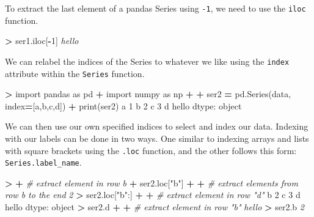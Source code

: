 \documentclass[
]{book}
\newenvironment{Shaded}{\begin{snugshade}}{\end{snugshade}}
\newcommand{\BuiltInTok}[1]{#1}
\newcommand{\CommentTok}[1]{\textcolor[rgb]{0.56,0.35,0.01}{\textit{#1}}}
\newcommand{\DecValTok}[1]{\textcolor[rgb]{0.00,0.00,0.81}{#1}}
\newcommand{\ImportTok}[1]{#1}
\newcommand{\NormalTok}[1]{#1}
\newcommand{\OperatorTok}[1]{\textcolor[rgb]{0.81,0.36,0.00}{\textbf{#1}}}
\newcommand{\StringTok}[1]{\textcolor[rgb]{0.31,0.60,0.02}{#1}}
\begin{document}
To extract the last element of a pandas Series using \texttt{-1}, we need to use the \texttt{iloc} function.

\begin{Shaded}
\begin{Highlighting}[]
\OperatorTok{\textgreater{}}\NormalTok{ ser1.iloc[}\OperatorTok{{-}}\DecValTok{1}\NormalTok{]}
\CommentTok{\textquotesingle{}hello\textquotesingle{}}
\end{Highlighting}
\end{Shaded}

We can relabel the indices of the Series to whatever we like using the \texttt{index} attribute within the \texttt{Series} function.

\begin{Shaded}
\begin{Highlighting}[]
\OperatorTok{\textgreater{}} \ImportTok{import}\NormalTok{ pandas }\ImportTok{as}\NormalTok{ pd }
\OperatorTok{+} \ImportTok{import}\NormalTok{ numpy }\ImportTok{as}\NormalTok{ np}
\OperatorTok{+} 
\OperatorTok{+}\NormalTok{ ser2 }\OperatorTok{=}\NormalTok{ pd.Series(data, index}\OperatorTok{=}\NormalTok{[}\StringTok{\textquotesingle{}a\textquotesingle{}}\NormalTok{,}\StringTok{\textquotesingle{}b\textquotesingle{}}\NormalTok{,}\StringTok{\textquotesingle{}c\textquotesingle{}}\NormalTok{,}\StringTok{\textquotesingle{}d\textquotesingle{}}\NormalTok{])}
\OperatorTok{+} \BuiltInTok{print}\NormalTok{(ser2)}
\NormalTok{a        }\DecValTok{1}
\NormalTok{b        }\DecValTok{2}
\NormalTok{c        }\DecValTok{3}
\NormalTok{d    hello}
\NormalTok{dtype: }\BuiltInTok{object}
\end{Highlighting}
\end{Shaded}

We can then use our own specified indices to select and index our data. Indexing with our labels can be done in two ways. One similar to indexing arrays and lists with square brackets using the \texttt{.loc} function, and the other follows this form: \texttt{Series.label\_name}.

\begin{Shaded}
\begin{Highlighting}[]
\OperatorTok{\textgreater{}} 
\OperatorTok{+} \CommentTok{\# extract element in row b}
\OperatorTok{+}\NormalTok{ ser2.loc[}\StringTok{"b"}\NormalTok{]}
\OperatorTok{+} 
\OperatorTok{+} \CommentTok{\# extract elements from row b to the end}
\CommentTok{\textquotesingle{}2\textquotesingle{}}
\OperatorTok{\textgreater{}}\NormalTok{ ser2.loc[}\StringTok{"b"}\NormalTok{:]}
\OperatorTok{+} 
\OperatorTok{+} \CommentTok{\# extract element in row "d"}
\NormalTok{b        }\DecValTok{2}
\NormalTok{c        }\DecValTok{3}
\NormalTok{d    hello}
\NormalTok{dtype: }\BuiltInTok{object}
\OperatorTok{\textgreater{}}\NormalTok{ ser2.d}
\OperatorTok{+} 
\OperatorTok{+} \CommentTok{\# extract element in row "b"}
\CommentTok{\textquotesingle{}hello\textquotesingle{}}
\OperatorTok{\textgreater{}}\NormalTok{ ser2.b}
\CommentTok{\textquotesingle{}2\textquotesingle{}}
\end{Highlighting}
\end{Shaded}
\end{document}
